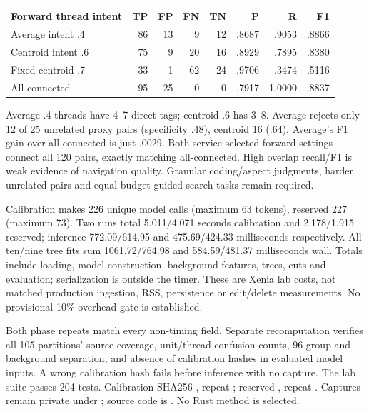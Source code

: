 \documentclass[11pt]{article}
\begin{document}
\begin{center}
\begin{tabular}{lrrrrrrr}
\toprule
Forward thread intent & TP & FP & FN & TN & P & R & F1 \\
\midrule
Average intent .4 & 86 & 13 & 9 & 12 & .8687 & .9053 & .8866 \\
Centroid intent .6 & 75 & 9 & 20 & 16 & .8929 & .7895 & .8380 \\
Fixed centroid .7 & 33 & 1 & 62 & 24 & .9706 & .3474 & .5116 \\
All connected & 95 & 25 & 0 & 0 & .7917 & 1.0000 & .8837 \\
\bottomrule
\end{tabular}
\end{center}
Average .4 threads have 4--7 direct tags; centroid .6 has 3--8. Average rejects
only 12 of 25 unrelated proxy pairs (specificity .48), centroid 16 (.64).
Average's F1 gain over all-connected is just .0029. Both service-selected forward
settings connect all 120 pairs, exactly matching all-connected. High overlap
recall/F1 is weak evidence of navigation quality. Granular coding/aspect judgments,
harder unrelated pairs and equal-budget guided-search tasks remain required.

Calibration makes 226 unique model calls (maximum 63 tokens), reserved 227
(maximum 73). Two runs total 5.011/4.071 seconds calibration and 2.178/1.915
reserved; inference 772.09/614.95 and 475.69/424.33 milliseconds respectively.
All ten/nine tree fits sum 1061.72/764.98 and 584.59/481.37 milliseconds wall.
Totals include loading, model construction, background features, trees, cuts and
evaluation; serialization is outside the timer. These are Xenia lab costs,
not matched production ingestion, RSS, persistence or edit/delete measurements.
No provisional 10\% overhead gate is established.

Both phase repeats match every non-timing field. Separate recomputation verifies
all 105 partitions' source coverage, unit/thread confusion counts, 96-group and
background separation, and absence of calibration hashes in evaluated model
inputs. A wrong calibration hash fails before inference with no capture.
The lab suite passes 204 tests. Calibration SHA256
,
repeat ;
reserved ,
repeat .
Captures remain private under ; source code
is . No Rust method is selected.
\end{document}
